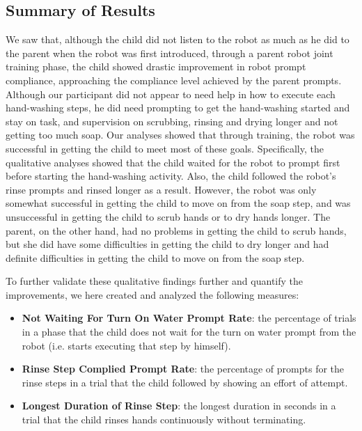 \subsection{Summary of Results}
We saw that, although the child did not listen to the robot as much as he did to the parent when the robot was first introduced, through a parent robot joint training phase, the child showed drastic improvement in robot prompt compliance, approaching the compliance level achieved by the parent prompts.  Although our participant did not appear to need help in how to execute each hand-washing steps, he did need prompting to get the hand-washing started and stay on task, and supervision on scrubbing, rinsing and drying longer and not getting too much soap.  Our analyses showed that through training, the robot was successful in getting the child to meet most of these goals.  Specifically, the qualitative analyses showed that the child waited for the robot to prompt first before starting the hand-washing activity.  Also, the child followed the robot's rinse prompts and rinsed longer as a result.  However, the robot was only somewhat successful in getting the child to move on from the soap step, and was unsuccessful in getting the child to scrub hands or to dry hands longer.  The parent, on the other hand, had no problems in getting the child to scrub hands, but she did have some difficulties in getting the child to dry longer and had definite difficulties in getting the child to move on from the soap step.

%
To further validate these qualitative findings further and quantify the improvements, we here created and analyzed the following measures:
\begin{itemize}
	\item \textbf{Not Waiting For Turn On Water Prompt Rate}: the percentage of trials in a phase that the child does not wait for the turn on water prompt from the robot (i.e. starts executing that step by himself).
	\item \textbf{Rinse Step Complied Prompt Rate}: the percentage of prompts for the rinse steps in a trial that the child followed by showing an effort of attempt.
	\item \textbf{Longest Duration of Rinse Step}: the longest duration in seconds in a trial that the child rinses hands continuously without terminating.
\end{itemize}
